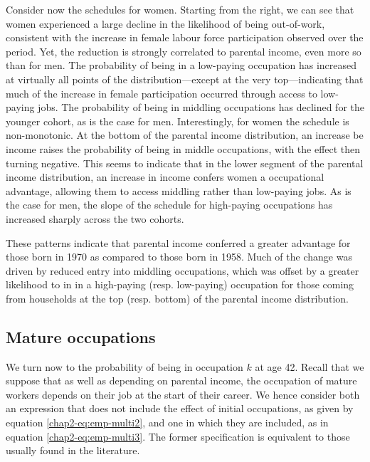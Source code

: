 Consider now the schedules for women. Starting from the right, we can see that women experienced a large decline in the likelihood of being out-of-work, consistent with the increase in female labour force participation observed over the period. Yet, the reduction is strongly correlated to parental income, even more so than for men. The probability of being in a low-paying occupation has increased at virtually all points of the distribution---except at the very top---indicating that much of the increase in female participation occurred through access to low-paying jobs. The probability of being in middling occupations has declined for the younger cohort, as is the case for men. Interestingly, for women the schedule is non-monotonic. At the bottom of the parental income distribution, an increase be income raises the probability of being in middle occupations, with the effect then turning negative. This seems to indicate that in the lower segment of the parental income distribution, an increase in income confers women a occupational advantage, allowing them to access middling rather than low-paying jobs. As is the case for men, the slope of the schedule for high-paying occupations has increased sharply across the two cohorts.

These patterns indicate that parental income conferred a greater advantage for those born in 1970 as compared to those born in 1958. Much of the change was driven by reduced entry into middling occupations, which was offset by a greater likelihood to in in a high-paying (resp. low-paying) occupation for those coming from households at the top (resp. bottom) of the parental income distribution.

\subsection{Mature occupations} \label{chap2-mature}

We turn now to the probability of being in occupation $k$ at age 42. Recall that we suppose that as well as depending on parental income, the occupation of mature workers depends on their job at the start of their career. We hence consider both an expression that does not include the effect of initial occupations, as given by equation \eqref{chap2-eq:emp-multi2}, and one in which they are included, as in equation \eqref{chap2-eq:emp-multi3}. The former specification is equivalent to those usually found in the literature.

